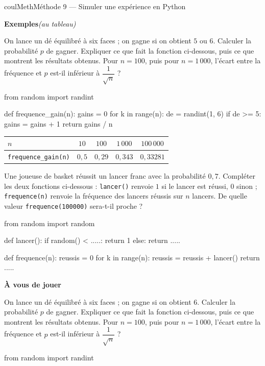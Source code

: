 \documentclass[11pt,a4paper]{article}
\makeatletter
\newcounter{lycee@signet}
\newcommand{\signet}[3][]{\stepcounter{lycee@signet}%
  \edef\lycee@dest{\if\relax\detokenize{#1}\relax
    signet.\arabic{lycee@signet}\else#1\fi}%
  \hypertarget{\lycee@dest}{}\bookmark[level=#2,dest=\lycee@dest]{#3}}
\newcounter{methode}
\newenvironment{methodebox}[1][Méthode]{\stepcounter{methode}%
  \begin{boitecours}[phantom={\signet[methode-\arabic{methode}]{2}{#1}}]{coulMeth}{#1}}%
  {\end{boitecours}}
\newcommand{\etape}[1]{\par\smallskip\textbf{\color{coulMeth}#1}\par\nobreak\smallskip}
\newcommand{\autableau}{\hfill{\footnotesize\itshape\color{black!45}(au tableau)}}
\newcommand{\etapeexemples}{%
    \par\smallskip\textbf{\color{coulMeth}Exemples}\autableau\par\nobreak\smallskip}
\makeatother
\begin{document}
\begin{methodebox}[Méthode 9 --- Simuler une expérience en Python]
\etapeexemples
\begin{questions}[label=\alph*)]
  \item On lance un dé équilibré à six faces ; on gagne si on obtient $5$ ou $6$.
    Calculer la probabilité $p$ de gagner. Expliquer ce que fait la fonction
    ci-dessous, puis ce que montrent les résultats obtenus. Pour $n=100$, puis pour
    $n=1\,000$, l'écart entre la fréquence et $p$ est-il inférieur à
    $\dfrac{1}{\sqrt{n}}$ ?
\end{questions}
\begin{python}
from random import randint

def frequence_gain(n):
    gains = 0
    for k in range(n):
        de = randint(1, 6)
        if de >= 5:
            gains = gains + 1
    return gains / n
\end{python}
\begin{center}
\renewcommand{\arraystretch}{1.5}
\begin{tabular}{|l|c|c|c|c|}
\hline
$n$ & $10$ & $100$ & $1\,000$ & $100\,000$ \\
\hline
\texttt{frequence\_gain(n)} & $0{,}5$ & $0{,}29$ & $0{,}343$ & $0{,}33281$ \\
\hline
\end{tabular}
\end{center}
\begin{questions}[label=\alph*),start=2]
  \item Une joueuse de basket réussit un lancer franc avec la probabilité $0{,}7$.
    Compléter les deux fonctions ci-dessous : \texttt{lancer()} renvoie $1$ si le
    lancer est réussi, $0$ sinon ; \texttt{frequence(n)} renvoie la fréquence des
    lancers réussis sur $n$ lancers. De quelle valeur \texttt{frequence(100000)}
    sera-t-il proche ?
\end{questions}
\begin{python}
from random import random

def lancer():
    if random() < .....:
        return 1
    else:
        return .....

def frequence(n):
    reussis = 0
    for k in range(n):
        reussis = reussis + lancer()
    return .....
\end{python}

\etape{À vous de jouer}
\begin{questions}[label=\alph*)]
  \item On lance un dé équilibré à six faces ; on gagne si on obtient $6$. Calculer la
    probabilité $p$ de gagner. Expliquer ce que fait la fonction ci-dessous, puis ce
    que montrent les résultats obtenus. Pour $n=100$, puis pour $n=1\,000$, l'écart
    entre la fréquence et $p$ est-il inférieur à $\dfrac{1}{\sqrt{n}}$ ?
\end{questions}
\begin{python}
from random import randint


\end{python}
\end{methodebox}
\end{document}
